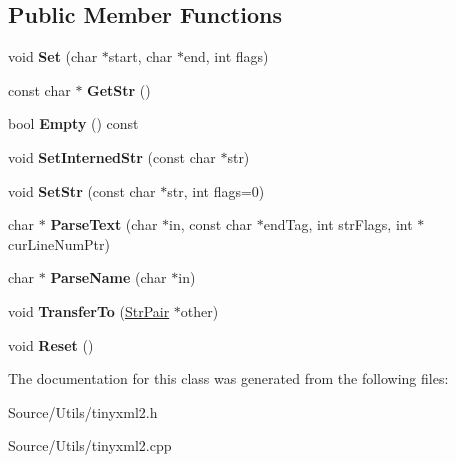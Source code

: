 \subsection*{Public Member Functions}
\begin{DoxyCompactItemize}
\item 
\mbox{\label{classtinyxml2_1_1_str_pair_a4f05549373394266a1eecba26813c166}} 
void {\bfseries Set} (char $\ast$start, char $\ast$end, int flags)
\item 
\mbox{\label{classtinyxml2_1_1_str_pair_ad87e3d11330f5e689ba1e7e54c023b57}} 
const char $\ast$ {\bfseries Get\+Str} ()
\item 
\mbox{\label{classtinyxml2_1_1_str_pair_aca963a7eaa900bfddbea7312f040b39c}} 
bool {\bfseries Empty} () const
\item 
\mbox{\label{classtinyxml2_1_1_str_pair_a2baf6230e18333e02ab65d0897ee3941}} 
void {\bfseries Set\+Interned\+Str} (const char $\ast$str)
\item 
\mbox{\label{classtinyxml2_1_1_str_pair_a1f82ec6b5bee35ee7466d8565e43b1de}} 
void {\bfseries Set\+Str} (const char $\ast$str, int flags=0)
\item 
\mbox{\label{classtinyxml2_1_1_str_pair_a68e6999b7677fa711287ececb9ba317e}} 
char $\ast$ {\bfseries Parse\+Text} (char $\ast$in, const char $\ast$end\+Tag, int str\+Flags, int $\ast$cur\+Line\+Num\+Ptr)
\item 
\mbox{\label{classtinyxml2_1_1_str_pair_aa6d8998efceba41d87ec2300c70a6085}} 
char $\ast$ {\bfseries Parse\+Name} (char $\ast$in)
\item 
\mbox{\label{classtinyxml2_1_1_str_pair_a35f795b1557fe5fdcbd93d3cc5d6b939}} 
void {\bfseries Transfer\+To} (\mbox{\hyperlink{classtinyxml2_1_1_str_pair}{Str\+Pair}} $\ast$other)
\item 
\mbox{\label{classtinyxml2_1_1_str_pair_a80c1b3bd99bf62ae85c94a29ce537125}} 
void {\bfseries Reset} ()
\end{DoxyCompactItemize}


The documentation for this class was generated from the following files\+:\begin{DoxyCompactItemize}
\item 
Source/\+Utils/tinyxml2.\+h\item 
Source/\+Utils/tinyxml2.\+cpp\end{DoxyCompactItemize}
